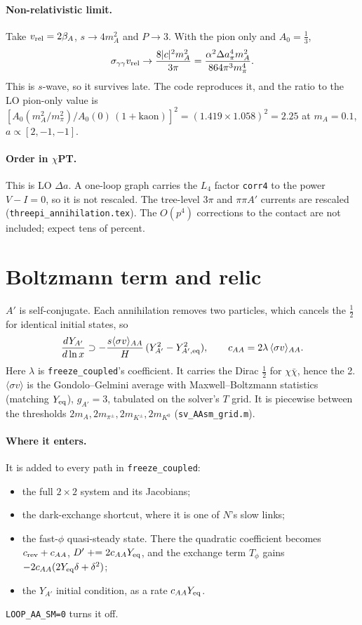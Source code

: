 \documentclass{article}
\newcommand{\Da}{\Delta a}
\newcommand{\mpi}{m_\pi}
\begin{document}
\paragraph{Non-relativistic limit.} Take $v_{\rm rel}=2\beta_A$, $s\to4m_A^2$ and $P\to3$. With
the pion only and $A_0=\tfrac13$,
\begin{equation}
\sigma_{\gamma\gamma}v_{\rm rel}\to\frac{8|c|^2m_A^2}{3\pi}
=\frac{\alpha^2\Da_\pi^4m_A^2}{864\pi^3\mpi^4}.
\end{equation}
This is $s$-wave, so it survives late. The code reproduces it, and the ratio to the LO pion-only
value is $[A_0(m_A^2/\mpi^2)/A_0(0)\,(1+\text{kaon})]^2=(1.419\times1.058)^2=2.25$ at
$m_A=0.1$, $a\propto[2,-1,-1]$.

\paragraph{Order in $\chi$PT.} This is LO $\Da$. A one-loop graph carries the $L_4$ factor
\texttt{corr4} to the power $V-I=0$, so it is not rescaled. The tree-level $3\pi$ and
$\pi\pi A'$ currents are rescaled (\texttt{threepi\_annihilation.tex}). The $O(p^4)$ corrections
to the contact are not included; expect tens of percent.

\section{Boltzmann term and relic}

$A'$ is self-conjugate. Each annihilation removes two particles, which cancels the $\tfrac12$
for identical initial states, so
\begin{equation}
\frac{dY_{A'}}{d\ln x}\supset-\frac{s\langle\sigma v\rangle_{AA}}{H}\,(Y_{A'}^2-Y_{A',\rm eq}^2),
\qquad c_{AA}=2\lambda\,\langle\sigma v\rangle_{AA}.
\end{equation}
Here $\lambda$ is \texttt{freeze\_coupled}'s coefficient. It carries the Dirac $\tfrac12$ for
$\chi\bar\chi$, hence the 2. $\langle\sigma v\rangle$ is the Gondolo--Gelmini average with
Maxwell--Boltzmann statistics (matching $Y_{\rm eq}$), $g_{A'}=3$, tabulated on the solver's $T$
grid. It is piecewise between the thresholds $2m_A,2m_{\pi^\pm},2m_{K^\pm},2m_{K^0}$
(\texttt{sv\_AAsm\_grid.m}).

\paragraph{Where it enters.} It is added to every path in \texttt{freeze\_coupled}:
\begin{itemize}
\item the full $2\times2$ system and its Jacobians;
\item the dark-exchange shortcut, where it is one of $N$'s slow links;
\item the fast-$\phi$ quasi-steady state. There the quadratic coefficient becomes
  $c_{\rm rev}+c_{AA}$, $D'\mathrel{+}=2c_{AA}Y_{\rm eq}$, and the exchange term $T_\phi$ gains
  $-2c_{AA}(2Y_{\rm eq}\delta+\delta^2)$;
\item the $Y_{A'}$ initial condition, as a rate $c_{AA}Y_{\rm eq}$.
\end{itemize}
\texttt{LOOP\_AA\_SM=0} turns it off.
\end{document}
